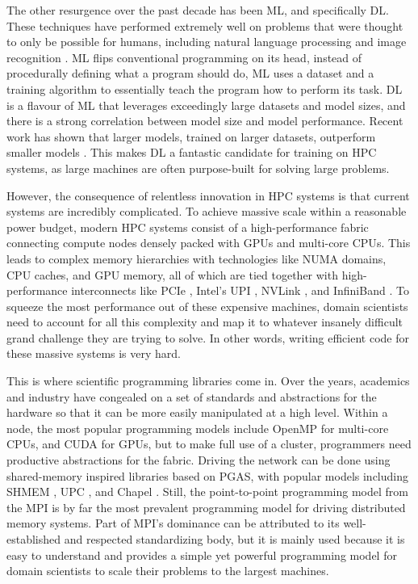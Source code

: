 The other resurgence over the past decade has been \gls{ML}, and specifically \gls{DL}.
These techniques have performed extremely well on problems that were thought to only be possible for humans, including natural language processing \cite{Vaswani2017AttentionTransformer} and image recognition \cite{Krizhevsky2012AlexNet}.
\gls{ML} flips conventional programming on its head, instead of procedurally defining what a program should do, \gls{ML} uses a dataset and a training algorithm to essentially teach the program how to perform its task.
\gls{DL} is a flavour of \gls{ML} that leverages exceedingly large datasets and model sizes, and there is a strong correlation between model size and model performance.
Recent work has shown that larger models, trained on larger datasets, outperform smaller models \cite{Brown2020GPT3}.
This makes \gls{DL} a fantastic candidate for training on \gls{HPC} systems, as large machines are often purpose-built for solving large problems. 

However, the consequence of relentless innovation in \gls{HPC} systems is that current systems are incredibly complicated.
To achieve massive scale within a reasonable power budget, modern \gls{HPC} systems consist of a high-performance fabric connecting compute nodes densely packed with \gls{GPU}s and multi-core \gls{CPU}s.
This leads to complex memory hierarchies with technologies like \gls{NUMA} domains, \gls{CPU} caches, and \gls{GPU} memory, all of which are tied together with high-performance interconnects like \gls{PCIe} \cite{PCIeV5Spec}, Intel's \gls{UPI} \cite{XeonTechOverview}, NVLink \cite{Foley2017PascaleAndNVLink}, and InfiniBand \cite{IBSpec}.
To squeeze the most performance out of these expensive machines, domain scientists need to account for all this complexity and map it to whatever insanely difficult grand challenge they are trying to solve.
In other words, writing efficient code for these massive systems is very hard.

This is where scientific programming libraries come in.
Over the years, academics and industry have congealed on a set of standards and abstractions for the hardware so that it can be more easily manipulated at a high level.
Within a node, the most popular programming models include OpenMP \cite{OpenMP} for multi-core \gls{CPU}s, and CUDA for \gls{GPU}s, but to make full use of a cluster, programmers need productive abstractions for the fabric.
Driving the network can be done using shared-memory inspired libraries based on \gls{PGAS}, with popular models including SHMEM \cite{OpenSHMEM}, \gls{UPC} \cite{UPC}, and Chapel \cite{Chapel}. 
Still, the point-to-point programming model from the \gls{MPI} \cite{mpi40} is by far the most prevalent programming model for driving distributed memory systems.
Part of \gls{MPI}'s dominance can be attributed to its well-established and respected standardizing body, but it is mainly used because it is easy to understand and provides a simple yet powerful programming model for domain scientists to scale their problems to the largest machines. 

